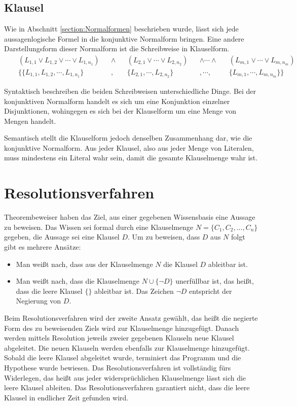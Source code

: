 		\subsection{Klausel}
Wie in Abschnitt \ref{section:Normalformen} beschrieben wurde, lässt sich jede aussagenlogische Formel in die konjunktive Normalform bringen. Eine andere Darstellungsform dieser Normalform ist die Schreibweise in Klauselform.
\begin{align*}
	&& (L_{1,1} \vee L_{1,2} \vee \cdots \vee L_{1,n_1}) &&\wedge &&
	(L_{2,1} \vee\cdots\vee L_{2,n_2}) && \wedge\cdots\wedge &&
	(L_{m,1} \vee\cdots\vee L_{m,n_m}) \\
	&& 
	\{\{L_{1,1},L_{1,2},\cdots,L_{1,n_1}\}&&,&&
	\{L_{2,1},\cdots,L_{2,n_2}\} &&,\cdots,&&
	\{L_{m,1},\cdots,L_{m,n_m}\}\}
\end{align*}

Syntaktisch beschreiben die beiden Schreibweisen unterschiedliche Dinge. Bei der konjunktiven Normalform handelt es sich um eine Konjunktion einzelner Disjunktionen, wohingegen es sich bei der Klauselform um eine Menge von Mengen handelt.

Semantisch stellt die Klauselform jedoch denselben Zusammenhang dar, wie die konjunktive Normalform. Aus jeder Klausel, also aus jeder Menge von Literalen, muss mindestens ein Literal wahr sein, damit die gesamte Klauselmenge wahr ist.


	\section{Resolutionsverfahren}

Theorembeweiser haben das Ziel, aus einer gegebenen Wissensbasis eine Aussage zu beweisen. Das Wissen sei formal durch eine Klauselmenge $N=\{C_1, C_2, ..., C_n \}$ gegeben, die Aussage sei eine Klausel $D$. Um zu beweisen, dass $D$ aus $N$ folgt gibt es mehrere Ansätze: 
\begin{itemize}
\item Man weißt nach, dass aus der Klauselmenge $N$ die Klausel $D$ ableitbar ist. 
\item Man weißt nach, dass die Klauselmenge $N\cup\{\neg D\}$  unerfüllbar ist, das heißt, dass die leere Klausel $\{\}$ ableitbar ist. Das Zeichen $\neg D$ entspricht der Negierung von $D$.
\end{itemize}

Beim Resolutionsverfahren wird der zweite Ansatz gewählt, das heißt die negierte Form des zu beweisenden Ziels wird zur Klauselmenge hinzugefügt. Danach werden mittels Resolution jeweils zweier gegebenen Klauseln neue Klausel abgeleitet. Die neuen Klauseln werden ebenfalls zur Klauselmenge hinzugefügt. Sobald die leere Klausel abgeleitet wurde, terminiert das Programm und die Hypothese wurde bewiesen. Das Resolutionsverfahren ist vollständig fürs Widerlegen, das heißt aus jeder widersprüchlichen Klauselmenge lässt sich die leere Klausel ableiten. Das Resolutionsverfahren garantiert nicht, dass die leere Klausel in endlicher Zeit gefunden wird. \cite{Chang1973Symb}

